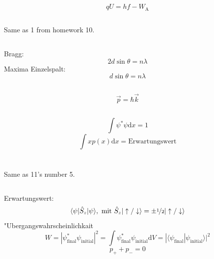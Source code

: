 \documentclass[12pt]{report}
\newcommand{\dd}{\mathrm{d}}
\begin{document}
\subsection{}
\[qU=hf-W_\mathrm{A}\]

\subsection{}
Same as 1 from homework 10.

\subsection{}
Bragg:
\[2d\sin\theta=n\lambda\]
Maxima Einzelspalt:
\[d\sin\theta=n\lambda\]

\subsection{}
\[\vec{p}=\hbar\vec{k}\]

\subsection{}
\[\int\psi^*\psi\dd x=1\]
\[\int x p(x)\dd x=\textrm{Erwartungswert}\]

\section{}

\subsection{}

Same as 11's number 5.

\subsection{}

Erwartungswert: 
\[\langle\psi|\hat{S}_z|\psi\rangle,\ \textrm{mit }\hat{S}_z|\uparrow/\downarrow\rangle=\pm\nicefrac{1}{2}|\uparrow/\downarrow\rangle\]
"Ubergangswahrscheinlichkait
\[W=|\psi^*_\mathrm{final}\psi_\mathrm{initial}|^2=\int\psi^*_\mathrm{final}\psi_\mathrm{initial}\dd V=|\langle\psi_\mathrm{final}|\psi_\mathrm{initial}\rangle|^2\]
\[p_++p_-=0\]

\subsection{}
\end{document}

